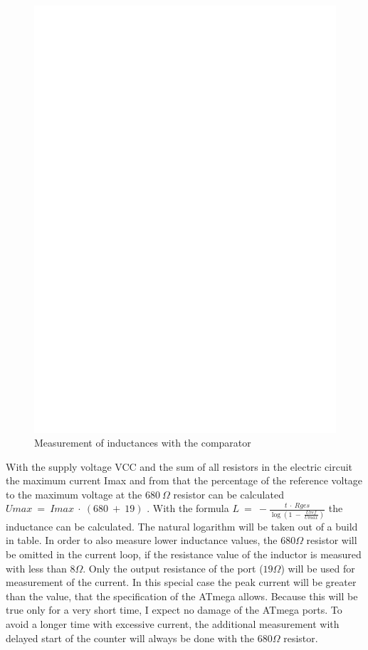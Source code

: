 \begin{figure}[H]
\centering
\includegraphics[]{../FIG/Inductance.eps}
\caption{Measurement of inductances with the comparator}
\label{fig:Inductance}
\end{figure}

With the supply voltage VCC and the sum of all resistors in the electric circuit the maximum current Imax and from
that the percentage of the reference voltage to the maximum voltage at the \(680~\Omega\) resistor can be calculated
\(Umax~=~Imax~\cdot~(680~+~19)\) .
With the formula \(L~=~-\frac{t~\cdot~Rges}{\log{(1~-~\frac{Uref}{Umax})}}\) the inductance can be calculated.
The natural logarithm will be taken out of a build in table.
In order to also measure lower inductance values, the \(680 \Omega\) resistor will be omitted in the current loop,
if the resistance value of the inductor is measured with less than \(8 \Omega\).
Only the output resistance of the port (\(19 \Omega\)) will be used for measurement of the current.
In this special case the peak current will be greater than the value, that the specification of the ATmega allows.
Because this will be true only for a very short time, I expect no damage of the ATmega ports.
To avoid a longer time with excessive current, the additional measurement with delayed start of the counter will always be
done with the \(680 \Omega\) resistor.


